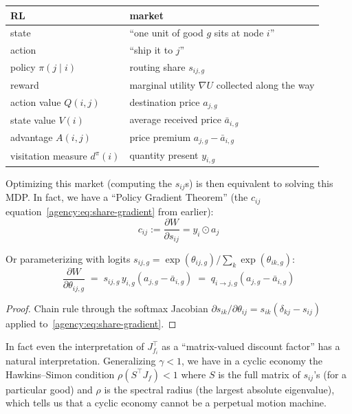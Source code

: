 \begin{center}
\begin{tabular}{@{}ll@{}}
\toprule
RL & market \\
\midrule
state                         & ``one unit of good $g$ sits at node $i$''             \\
action                        & ``ship it to $j$''                                    \\
policy $\pi(j \mid i)$        & routing share $s_{ij,g}$                              \\
reward                        & marginal utility $\nabla U$ collected along the way   \\
action value $Q(i,j)$         & destination price $a_{j,g}$                           \\
state value $V(i)$            & average received price $\bar a_{i,g}$                 \\
advantage $A(i,j)$            & price premium $a_{j,g} - \bar a_{i,g}$                \\
visitation measure $d^\pi(i)$ & quantity present $y_{i,g}$                            \\
\bottomrule
\end{tabular}
\end{center}

Optimizing this market (computing the $s_{ij}$s) is then equivalent to solving this MDP. In
fact, we have a ``Policy Gradient Theorem'' (the $c_{ij}$
equation~\eqref{agency:eq:share-gradient} from earlier):
\[c_{ij} := \frac{\partial W}{\partial s_{ij}} = y_i\odot a_j\]

Or parameterizing with logits $s_{ij,g} = \exp(\theta_{ij,g}) / \sum_k \exp(\theta_{ik,g})$:
\begin{equation}
\frac{\partial W}{\partial \theta_{ij,g}}
  \;=\; s_{ij,g}\, y_{i,g} \left( a_{j,g} - \bar a_{i,g} \right)
  \;=\; q_{i\to j, g} \left( a_{j,g} - \bar a_{i,g} \right)\label{agency:eq:logit-gradient}
\end{equation}

\begin{proof}
Chain rule through the softmax Jacobian
$\partial s_{ik}/\partial \theta_{ij} = s_{ik}(\delta_{kj} - s_{ij})$ applied
to~\eqref{agency:eq:share-gradient}.
\end{proof}

In fact even the interpretation of $J_{f_i}^\top$ as a ``matrix-valued discount factor'' has
a natural interpretation. Generalizing $\gamma <1$, we have in a cyclic economy the
Hawkins--Simon condition $\rho(S^\top J_f) < 1$ where $S$ is the full matrix of $s_{ij}$'s
(for a particular good) and $\rho$ is the spectral radius (the largest absolute eigenvalue),
which tells us that a cyclic economy cannot be a perpetual motion machine.

